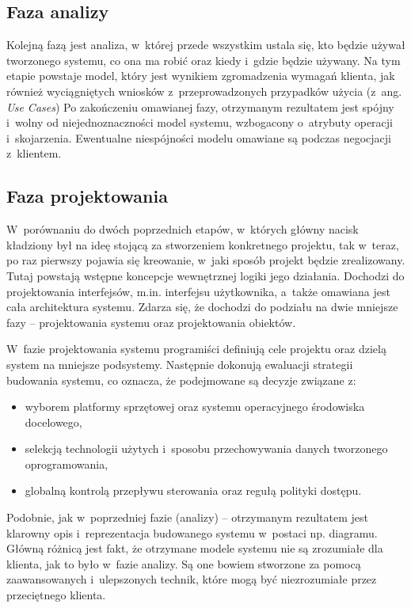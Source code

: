 \documentclass[oneside,polski,logo]{amuthesis}
\begin{document}
\subsection {Faza analizy}
Kolejną fazą jest analiza, w~której przede wszystkim ustala się, kto będzie używał tworzonego systemu, co ona ma robić oraz kiedy i~gdzie będzie używany. Na tym etapie powstaje model, który jest wynikiem zgromadzenia wymagań klienta, jak również wyciągniętych wniosków z~przeprowadzonych przypadków użycia (z~ang. \emph{Use Cases}) Po zakończeniu omawianej fazy, otrzymanym rezultatem jest spójny i~wolny od niejednoznaczności model systemu, wzbogacony o~atrybuty operacji i~skojarzenia. Ewentualne niespójności modelu omawiane są podczas negocjacji z~klientem.

\subsection {Faza projektowania}
W~porównaniu do dwóch poprzednich etapów, w~których główny nacisk kładziony był na ideę stojącą za stworzeniem konkretnego projektu, tak w~teraz, po raz pierwszy pojawia się kreowanie, w~jaki sposób projekt będzie zrealizowany. Tutaj powstają wstępne koncepcje wewnętrznej logiki jego działania. Dochodzi do projektowania interfejsów, m.in. interfejsu użytkownika, a~także omawiana jest cała architektura systemu. Zdarza się, że dochodzi do podziału na dwie mniejsze fazy – projektowania systemu oraz projektowania obiektów.

W~fazie projektowania systemu programiści definiują cele projektu oraz dzielą system na mniejsze podsystemy. Następnie dokonują ewaluacji strategii budowania systemu, co oznacza, że podejmowane są decyzje związane z:

\begin{itemize}
	\item  wyborem platformy sprzętowej oraz systemu operacyjnego środowiska docelowego,
	\item  selekcją technologii użytych i~sposobu przechowywania danych tworzonego oprogramowania,
	\item  globalną kontrolą przepływu sterowania oraz regułą polityki dostępu.
\end{itemize}

Podobnie, jak w~poprzedniej fazie (analizy) – otrzymanym rezultatem jest klarowny opis i~reprezentacja budowanego systemu w~postaci np. diagramu. Główną różnicą jest fakt, że otrzymane modele systemu nie są zrozumiałe dla klienta, jak to było w~fazie analizy. Są one bowiem stworzone za pomocą zaawansowanych i~ulepszonych technik, które mogą być niezrozumiałe przez przeciętnego klienta.
\end{document}
